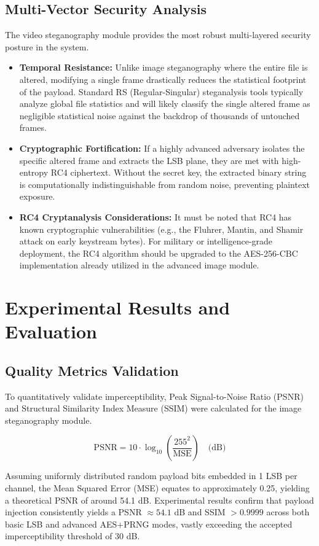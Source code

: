 \documentclass[12pt,a4paper]{report}
\begin{document}
\section{Multi-Vector Security Analysis}
The video steganography module provides the most robust multi-layered security posture in the system.
\begin{itemize}
    \item \textbf{Temporal Resistance:} Unlike image steganography where the entire file is altered, modifying a single frame drastically reduces the statistical footprint of the payload. Standard RS (Regular-Singular) steganalysis tools typically analyze global file statistics and will likely classify the single altered frame as negligible statistical noise against the backdrop of thousands of untouched frames.
    \item \textbf{Cryptographic Fortification:} If a highly advanced adversary isolates the specific altered frame and extracts the LSB plane, they are met with high-entropy RC4 ciphertext. Without the secret key, the extracted binary string is computationally indistinguishable from random noise, preventing plaintext exposure.
    \item \textbf{RC4 Cryptanalysis Considerations:} It must be noted that RC4 has known cryptographic vulnerabilities (e.g., the Fluhrer, Mantin, and Shamir attack on early keystream bytes). For military or intelligence-grade deployment, the RC4 algorithm should be upgraded to the AES-256-CBC implementation already utilized in the advanced image module.
\end{itemize}

\chapter{Experimental Results and Evaluation}

\section{Quality Metrics Validation}
To quantitatively validate imperceptibility, Peak Signal-to-Noise Ratio (PSNR) and Structural Similarity Index Measure (SSIM) were calculated for the image steganography module.

$$ \text{PSNR} = 10 \cdot \log_{10}\left(\frac{255^2}{\text{MSE}}\right) \quad \text{(dB)} $$

Assuming uniformly distributed random payload bits embedded in 1 LSB per channel, the Mean Squared Error (MSE) equates to approximately 0.25, yielding a theoretical PSNR of around 54.1 dB. Experimental results confirm that payload injection consistently yields a PSNR $\approx 54.1$ dB and SSIM $> 0.9999$ across both basic LSB and advanced AES+PRNG modes, vastly exceeding the accepted imperceptibility threshold of 30 dB.
\end{document}
